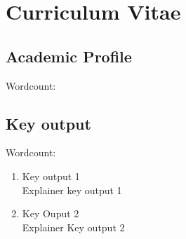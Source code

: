 \documentclass[10pt]{article}
\newcommand{\wordcount}[1]{}
\begin{document}
	
	\section{Curriculum Vitae}
	
	\subsection{Academic Profile}
	    Wordcount:\wordcount{Academic Profile}\\%
	\begin{NoHyper}
	\end{NoHyper}

	\subsection{Key output}
	Wordcount: \wordcount{Key output}\\
	\begin{enumerate}
	    \item \label{ko:ky1}{\small Key output 1\\} 
		{Explainer key output 1 }
	    \item \label{ko:ky2} {\small Key Ouput 2\\}
		{ Explainer Key output 2}
	\end{enumerate}
\end{document}
